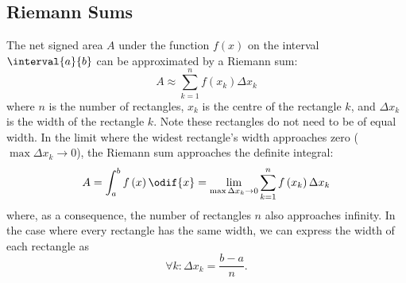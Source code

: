 \documentclass{article}
\begin{document}
\subsection{Riemann Sums}
\begin{theorem}
    \label{theorem:1d_riemann_sums}
    The net signed area \(A\) under the function \(f\left( x \right)\)
    on the interval \(\interval{a}{b}\) can be approximated by a Riemann
    sum:
    \begin{equation*}
        A \approx \sum_{k=1}^n f\left( x_k \right) \Delta x_k
    \end{equation*}
    where \(n\) is the number of rectangles, \(x_k\) is the centre of
    the rectangle \(k\), and \(\Delta x_k\) is the width of the
    rectangle \(k\). Note these rectangles do not need to be of equal
    width. In the limit where the widest rectangle's width approaches zero
    (\(\max{\Delta x_k}\to 0\)), the Riemann sum approaches the definite
    integral:
    \begin{equation*}
        A = \int_a^b f\left( x \right) \odif{x} = \lim_{\max{\Delta x_k}\to 0} \sum_{k=1}^n f\left( x_k \right) \Delta x_k
    \end{equation*}
    where, as a consequence, the number of rectangles \(n\) also
    approaches infinity.
    In the case where every rectangle has the same width, we can express
    the width of each rectangle as
    \begin{equation*}
        \forall k:\Delta x_k = \frac{b-a}{n}.
    \end{equation*}
\end{theorem}
\end{document}
